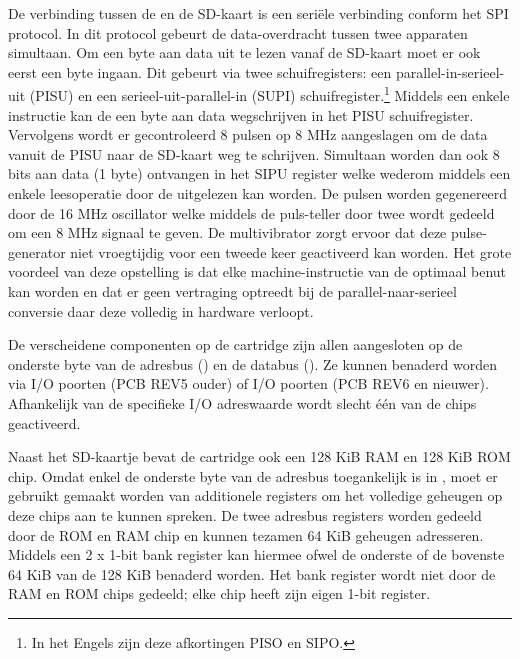 De verbinding tussen de  en de SD-kaart is een seriële verbinding conform het SPI protocol. In dit protocol gebeurt de data-overdracht tussen twee apparaten simultaan. Om een byte aan data uit te lezen vanaf de SD-kaart moet er ook eerst een byte ingaan. Dit gebeurt via twee schuifregisters: een parallel-in-serieel-uit (PISU) en een serieel-uit-parallel-in (SUPI) schuifregister.\footnote{In het Engels zijn deze afkortingen PISO en SIPO.} Middels een enkele instructie kan de  een byte aan data wegschrijven in het PISU schuifregister. Vervolgens wordt er gecontroleerd 8 pulsen op 8 MHz aangeslagen om de data vanuit de PISU naar de SD-kaart weg te schrijven. Simultaan worden dan ook 8 bits aan data (1 byte) ontvangen in het SIPU register welke wederom middels een enkele leesoperatie door de  uitgelezen kan worden. De pulsen worden gegenereerd door de 16 MHz oscillator welke middels de puls-teller door twee wordt gedeeld om een 8 MHz signaal te geven. De multivibrator zorgt ervoor dat deze pulse-generator niet vroegtijdig voor een tweede keer geactiveerd kan worden. Het grote voordeel van deze opstelling is dat elke machine-instructie van de  optimaal benut kan worden en dat er geen vertraging optreedt bij de parallel-naar-serieel conversie daar deze volledig in hardware verloopt.


De verscheidene componenten op de  cartridge zijn allen aangesloten op de onderste byte van de adresbus () en de databus (). Ze kunnen benaderd worden via I/O poorten  (PCB REV5 ouder) of I/O poorten  (PCB REV6 en nieuwer). Afhankelijk van de specifieke I/O adreswaarde wordt slecht één van de chips geactiveerd.


Naast het SD-kaartje bevat de  cartridge ook een 128 KiB RAM en 128 KiB ROM chip. Omdat enkel de onderste byte van de adresbus toegankelijk is in , moet er gebruikt gemaakt worden van additionele registers om het volledige geheugen op deze chips aan te kunnen spreken. De twee adresbus registers worden gedeeld door de ROM en RAM chip en kunnen tezamen 64 KiB geheugen adresseren. Middels een 2 x 1-bit bank register kan hiermee ofwel de onderste of de bovenste 64 KiB van de 128 KiB benaderd worden. Het bank register wordt niet door de RAM en ROM chips gedeeld; elke chip heeft zijn eigen 1-bit register.

